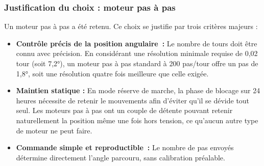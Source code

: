 \subsubsection{Justification du choix : moteur pas à pas}
Un moteur pas à pas a été retenu. Ce choix se justifie par trois critères majeurs :
\begin{itemize}
    \setlength{\itemsep}{6pt}
    \item \textbf{Contrôle précis de la position angulaire~:} Le nombre de tours doit être connu avec précision. En considérant une résolution minimale requise de 0,02 tour (soit 7,2°), un moteur pas à pas standard à 200 pas/tour offre un pas de 1,8°, soit une résolution quatre fois meilleure que celle exigée.
    
    \item \textbf{Maintien statique :} En mode réserve de marche, la phase de blocage sur 24 heures nécessite de retenir le mouvements afin d'éviter qu'il se dévide tout seul. Les moteurs pas à pas ont un couple de détente pouvant retenir naturellement la position même une fois hors tension, ce qu'aucun autre type de moteur ne peut faire.
    
    \item \textbf{Commande simple et reproductible~:} Le nombre de pas envoyés détermine directement l'angle parcouru, sans calibration préalable.
\end{itemize}
